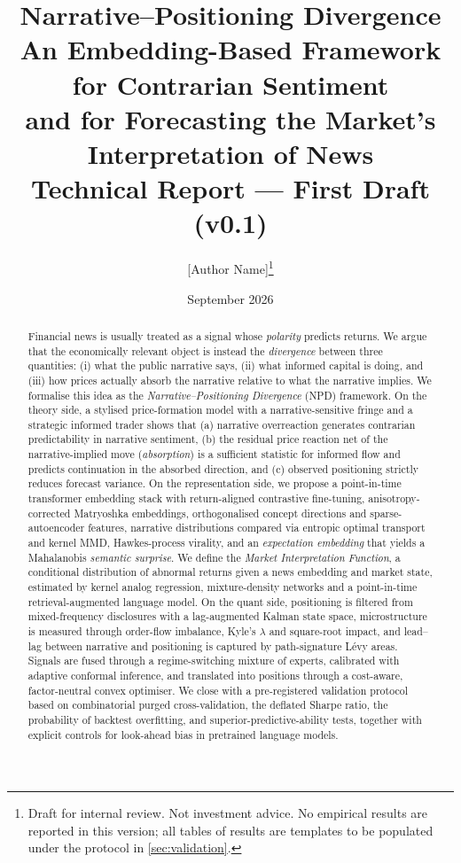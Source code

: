 \documentclass[11pt,a4paper]{article}
\title{\textbf{Narrative--Positioning Divergence}\\[4pt]
\large An Embedding-Based Framework for Contrarian Sentiment\\
and for Forecasting the Market's Interpretation of News\\[6pt]
\normalsize Technical Report --- First Draft (v0.1)}
\author{[Author Name]\thanks{Draft for internal review. Not investment advice. No empirical results are reported in this version; all tables of results are templates to be populated under the protocol in \cref{sec:validation}.}}
\date{September 2026}
\theoremstyle{plain}
\theoremstyle{definition}
\theoremstyle{remark}
\begin{document}
\maketitle

\begin{abstract}
\noindent
Financial news is usually treated as a signal whose \emph{polarity} predicts returns. We argue that the economically relevant object is instead the \emph{divergence} between three quantities: (i) what the public narrative says, (ii) what informed capital is doing, and (iii) how prices actually absorb the narrative relative to what the narrative implies. We formalise this idea as the \emph{Narrative--Positioning Divergence} (NPD) framework. On the theory side, a stylised price-formation model with a narrative-sensitive fringe and a strategic informed trader shows that (a) narrative overreaction generates contrarian predictability in narrative sentiment, (b) the residual price reaction net of the narrative-implied move (\emph{absorption}) is a sufficient statistic for informed flow and predicts continuation in the absorbed direction, and (c) observed positioning strictly reduces forecast variance. On the representation side, we propose a point-in-time transformer embedding stack with return-aligned contrastive fine-tuning, anisotropy-corrected Matryoshka embeddings, orthogonalised concept directions and sparse-autoencoder features, narrative distributions compared via entropic optimal transport and kernel MMD, Hawkes-process virality, and an \emph{expectation embedding} that yields a Mahalanobis \emph{semantic surprise}. We define the \emph{Market Interpretation Function}, a conditional distribution of abnormal returns given a news embedding and market state, estimated by kernel analog regression, mixture-density networks and a point-in-time retrieval-augmented language model. On the quant side, positioning is filtered from mixed-frequency disclosures with a lag-augmented Kalman state space, microstructure is measured through order-flow imbalance, Kyle's $\lambda$ and square-root impact, and lead--lag between narrative and positioning is captured by path-signature L\'evy areas. Signals are fused through a regime-switching mixture of experts, calibrated with adaptive conformal inference, and translated into positions through a cost-aware, factor-neutral convex optimiser. We close with a pre-registered validation protocol based on combinatorial purged cross-validation, the deflated Sharpe ratio, the probability of backtest overfitting, and superior-predictive-ability tests, together with explicit controls for look-ahead bias in pretrained language models.
\end{abstract}
\end{document}
